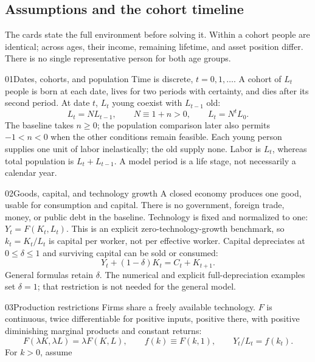 \subsection{Assumptions and the cohort timeline}\label{sec:olg-assumptions}

The cards state the full environment before solving it. Within a cohort people
are identical; across ages, their income, remaining lifetime, and asset position
differ. There is no single representative person for both age groups.

\begin{modelsetup}[1]
\begin{modelcondition}{01}{Dates, cohorts, and population}
Time is discrete, $t=0,1,\ldots$. A cohort of $L_t$ people is born at each date,
lives for two periods with certainty, and dies after its second period.
At date $t$, $L_t$ young coexist with $L_{t-1}$ old:
\[
L_t=NL_{t-1},\qquad N\equiv1+n>0,\qquad L_t=N^tL_0.
\]
The baseline takes $n\geq0$; the population comparison later also permits
$-1<n<0$ when the other conditions remain feasible. Each young person supplies
one unit of labor inelastically; the old supply none. Labor is $L_t$, whereas
total population is $L_t+L_{t-1}$. A model period is a life stage, not
necessarily a calendar year.
\end{modelcondition}
\begin{modelcondition}{02}{Goods, capital, and technology growth}
A closed economy produces one good, usable for consumption and capital.
There is no government, foreign trade, money, or public debt in the baseline.
Technology is fixed and normalized to one: $Y_t=F(K_t,L_t)$.
This is an explicit zero-technology-growth benchmark, so $k_t=K_t/L_t$ is
capital per worker, not per effective worker. Capital depreciates at
$0\leq\delta\leq1$ and surviving capital can be sold or consumed:
\[
Y_t+(1-\delta)K_t=C_t+K_{t+1}.
\]
General formulas retain $\delta$. The numerical and explicit full-depreciation
examples set $\delta=1$; that restriction is not needed for the general model.
\end{modelcondition}
\begin{modelcondition}{03}{Production restrictions}
Firms share a freely available technology. $F$ is continuous, twice
differentiable for positive inputs, positive there, with positive diminishing
marginal products and constant returns:
\[
F(\lambda K,\lambda L)=\lambda F(K,L),\qquad
f(k)\equiv F(k,1),\qquad Y_t/L_t=f(k_t).
\]
For $k>0$, assume
\[
\begin{gathered}

\end{gathered}\]
\end{modelcondition}
\end{modelsetup}
